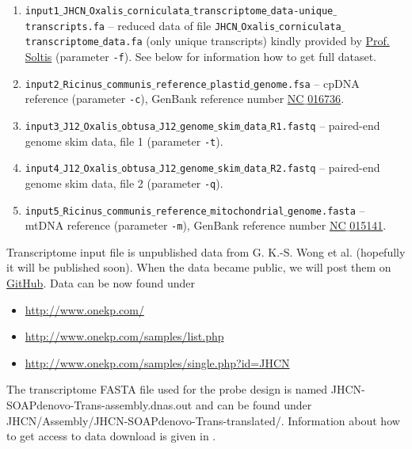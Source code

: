 \documentclass[a4paper, 11pt, twoside]{article}
\begin{document}
\begin{enumerate}
 \item \texttt{input1$\_$JHCN$\_$Oxalis$\_$corniculata$\_$transcriptome$\_$data-unique$\_$transcripts.fa} -- reduced data of file \texttt{JHCN$\_$Oxalis$\_$corniculata$\_$transcriptome$\_$data.fa} (only unique transcripts) kindly provided by \href{http://www.flmnh.ufl.edu/museum-voices/soltis-lab/doug-soltis/}{Prof. Soltis} (parameter \texttt{-f}). See below for information how to get full dataset.
  \item \texttt{input2$\_$Ricinus$\_$communis$\_$reference$\_$plastid$\_$genome.fsa} -- cpDNA reference (pa\-ra\-meter \texttt{-c}), GenBank reference number \href{http://www.ncbi.nlm.nih.gov/nuccore/372450118/}{NC$\_$016736}.
  \item \texttt{input3$\_$J12$\_$Oxalis$\_$obtusa$\_$J12$\_$genome$\_$skim$\_$data$\_$R1.fastq} -- paired-end genome skim data, file 1 (parameter \texttt{-t}).
  \item \texttt{input4$\_$J12$\_$Oxalis$\_$obtusa$\_$J12$\_$genome$\_$skim$\_$data$\_$R2.fastq} -- paired-end genome skim data, file 2 (parameter \texttt{-q}).
  \item \texttt{input5$\_$Ricinus$\_$communis$\_$reference$\_$mitochondrial$\_$genome.fasta} -- mtDNA reference (parameter \texttt{-m}), GenBank reference number \href{http://www.ncbi.nlm.nih.gov/nuccore/323649872/}{NC$\_$015141}.
\end{enumerate}

Transcriptome input file is unpublished data from G. K.-S. Wong et al. (hopefully it will be published soon). When the data became public, we will post them on \href{https://github.com/V-Z/sondovac/wiki/Sample-data}{GitHub}. Data can be now found under

\begin{itemize}
  \item \href{http://www.onekp.com/}{http://www.onekp.com/}
  \item \href{http://www.onekp.com/samples/list.php}{http://www.onekp.com/samples/list.php}
  \item \href{http://www.onekp.com/samples/single.php?id=JHCN}{http://www.onekp.com/samples/single.php?id=JHCN}
\end{itemize}

The transcriptome FASTA file used for the probe design is named JHCN-SOAPdenovo-Trans-assembly.dnas.out and can be found under JHCN/Assembly/JHCN-SOAPdenovo-Trans-translated/. Information about how to get access to data download is given in \citet{Matasci2014}.
\end{document}
